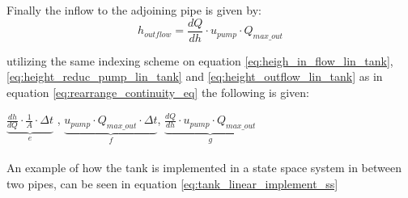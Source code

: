 Finally the inflow to the adjoining pipe is given by:
\begin{equation} \label{eq:height_outflow_lin_tank}
	h_{outflow} = \frac{dQ}{dh} \cdot u_{pump} \cdot Q_{max\_out}
\end{equation}

utilizing the same indexing scheme on equation \ref{eq:heigh_in_flow_lin_tank}, \ref{eq:height_reduc_pump_lin_tank} and \ref {eq:height_outflow_lin_tank} as in equation \ref{eq:rearrange_continuity_eq} the following is given:


	$\underbrace{\frac{dh}{dQ} \cdot \frac{1}{A} \cdot \Delta t}_{e}$ , $\underbrace{u_{pump} \cdot Q_{max\_out} \cdot \Delta t}_{f}$, $\underbrace{\frac{dQ}{dh} \cdot u_{pump} \cdot Q_{max\_out}}_{g}$ \\\\
An example of how the tank is implemented in a state space system in between two pipes, can be seen in equation \ref{eq:tank_linear_implement_ss}

